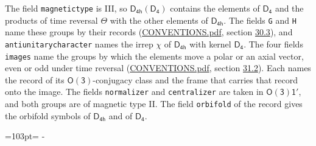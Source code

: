 \documentclass[10pt,a4paper]{article}
\newcommand{\needspace}[1]{\par\penalty-100\begingroup\dimen0=#1\relax\dimen2=\pagegoal
  \advance\dimen2-\pagetotal\ifdim\dimen0>\dimen2\relax\ifdim\dimen2>0pt\vfil\break\fi\fi
  \endgroup}
\numberwithin{equation}{section}
\newcommand{\grp}[1]{\mathsf{#1}}
\begin{document}
The field \texttt{magnetictype} is III, so $\grp{D_{4h}}(\grp{D_{4}})$ contains the elements of $\grp{D_{4}}$ and the products of time reversal $\varTheta$ with the other elements of $\grp{D_{4h}}$. The fields \texttt{G} and \texttt{H} name these groups by their records (\href{../../CONVENTIONS.pdf}{CONVENTIONS.pdf}, section \href{../../CONVENTIONS.pdf\#conv.30.3}{30.3}), and \texttt{antiunitarycharacter} names the irrep $\chi$ of $\grp{D_{4h}}$ with kernel $\grp{D_{4}}$. The four fields \texttt{images} name the groups by which the elements move a polar or an axial vector, even or odd under time reversal (\href{../../CONVENTIONS.pdf}{CONVENTIONS.pdf}, section \href{../../CONVENTIONS.pdf\#conv.31.2}{31.2}). Each names the record of its $\grp{O(3)}$-conjugacy class and the frame that carries that record onto the image. The fields \texttt{normalizer} and \texttt{centralizer} are taken in $\grp{O(3)1'}$, and both groups are of magnetic type II. The field \texttt{orbifold} of the record gives the orbifold symbols of $\grp{D_{4h}}$ and of $\grp{D_{4}}$.
\needspace{103pt}
\end{document}
